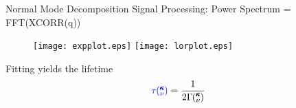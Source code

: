 \documentclass{beamer}
\newcommand{\kvt}{\mspace{-4.0mu}\left(\mspace{-8.0mu}
\begin{smallmatrix}&\pmb{\kappa} \\&\nu\end{smallmatrix}
\mspace{-2.0mu},t\right)}
\newcommand{\kvw}{\mspace{-4.0mu}\left(\mspace{-8.0mu}
\begin{smallmatrix}&\pmb{\kappa} \\&\nu\end{smallmatrix}
\mspace{-2.0mu},\omega\right)}
\newcommand{\kv}{\mspace{-4.0mu}\left(\mspace{-8.0mu}
\begin{smallmatrix}&\pmb{\kappa} \\&\nu\end{smallmatrix}
\mspace{-3.0mu}\right)}
\begin{document}
\begin{frame}{Normal Mode Decomposition}
Signal Processing:
Power Spectrum = FFT(XCORR(q))

\begin{figure}%
\begin{center}
\texttt{[image: expplot.eps]} \hspace{0.05\textwidth}%
\texttt{[image: lorplot.eps]} \\[2em]
\end{center}
\end{figure}
\vspace*{-1cm}
Fitting yields the lifetime
\begin{equation}\label{EQ:lifetime}
\textcolor{blue}{\tau\kv}=\frac{1}{2\Gamma\kv}
\end{equation}

\end{frame}
\end{document}
